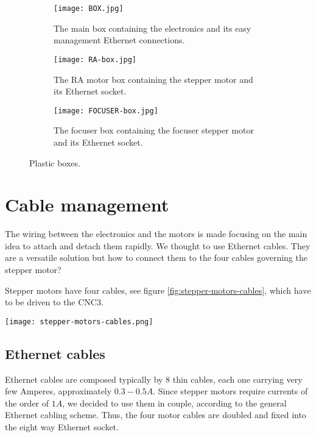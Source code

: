 \begin{figure*}
    \centering
    \begin{subfigure}[t!]
        {0.25\textwidth}
        \centering
        \texttt{[image: BOX.jpg]}
        \caption{The main box containing the electronics and its easy management Ethernet connections.}
        \label{fig:box}
    \end{subfigure}
    \begin{subfigure}[t!]
        {0.40\textwidth}
        \centering
        \texttt{[image: RA-box.jpg]}
        \caption{The RA motor box containing the stepper motor and its Ethernet socket.}
        \label{fig:RA-box}
    \end{subfigure}
    \begin{subfigure}[t!]
        {0.25\textwidth}
        \centering
        \texttt{[image: FOCUSER-box.jpg]}
        \caption{The focuser box containing the focuser stepper motor and its Ethernet socket.}
        \label{fig:focuser-box}
    \end{subfigure}
    \caption{Plastic boxes.}
    \label{fig:plastic-boxes}
\end{figure*}

\section{Cable management}
\label{sec:cable-menagement}
The wiring between the electronics and the motors is made focusing on the main idea to attach and detach them rapidly.
We thought to use Ethernet cables.
They are a versatile solution but how to connect them to the four cables governing the stepper motor?

Stepper motors have four cables, see figure \ref{fig:stepper-motors-cables}, which have to be driven to the CNC3.
\\
\begin{minipage}
    {0.5\textwidth}
    \centering
    \texttt{[image: stepper-motors-cables.png]}
    \label{fig:stepper-motors-cables}
\end{minipage}

\subsection{Ethernet cables}
Ethernet cables are composed typically by 8 thin cables, each one carrying very few Amperes, approximately \(0.3-0.5A\).
Since stepper motors require currents of the order of \(1A\), we decided to use them in couple, according to the general Ethernet cabling scheme.
Thus, the four motor cables are doubled and fixed into the eight way Ethernet socket.

